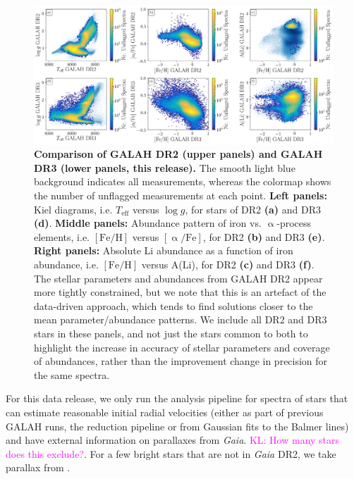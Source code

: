 \documentclass[fleqn,usenatbib,useAMS]{mnras}
\newcommand{\Teff}{$T_\mathrm{eff}$\xspace}
\newcommand{\logg}{$\log g$\xspace}
\newcommand{\feh}{$\mathrm{[Fe/H]}$\xspace}
\newcommand{\alphafe}{$\mathrm{[\upalpha/Fe]}$\xspace}
\newcommand{\Gaia}{\textit{Gaia}\xspace}
\newcommand{\Hipparcos}{{\sc{Hipparcos}}\xspace}
\newcommand\KL[1]{\textcolor{magenta}{KL: #1}}
\begin{document}
\begin{figure}
\centering
\includegraphics[width=\textwidth]{figures/galah_dr3_comparison_dr2.png}
\caption{
\textbf{Comparison of GALAH DR2 (upper panels) and GALAH DR3 (lower panels, this release).}
The smooth light blue background indicates all measurements, whereas the colormap shows the number of unflagged measurements at each point. \textbf{Left panels:} Kiel diagrams, i.e. \Teff versus \logg, for stars of DR2 \textbf{(a)} and DR3 \textbf{(d)}. \textbf{Middle panels:} Abundance pattern of iron vs. $\upalpha$-process elements, i.e. \feh versus \alphafe, for DR2 \textbf{(b)} and DR3 \textbf{(e)}. \textbf{Right panels: } Absolute Li abundance as a function of iron abundance, i.e. \feh versus A(Li), for DR2 \textbf{(c)} and DR3 \textbf{(f)}. The stellar parameters and abundances from GALAH DR2 appear more tightly constrained, but we note that this is an artefact of the data-driven approach, which tends to find solutions closer to the mean parameter/abundance patterns. We include all DR2 and DR3 stars in these panels, and not just the stars common to both to highlight the increase in accuracy of stellar parameters and coverage of abundances, rather than the improvement change in precision for the same spectra.}
\label{fig:galah_dr3_comparison_dr2}
\end{figure}

For this data release, we only run the analysis pipeline for spectra of stars that can estimate reasonable initial radial velocities (either as part of previous GALAH runs, the reduction pipeline or from Gaussian fits to the Balmer lines) and have external information on parallaxes from \Gaia \citep{Lindegren2018}. \KL{How many stars does this exclude?}. For a few bright stars that are not in \Gaia DR2, we take parallax from \Hipparcos \citep{vanLeeuwen2007}.
\end{document}
